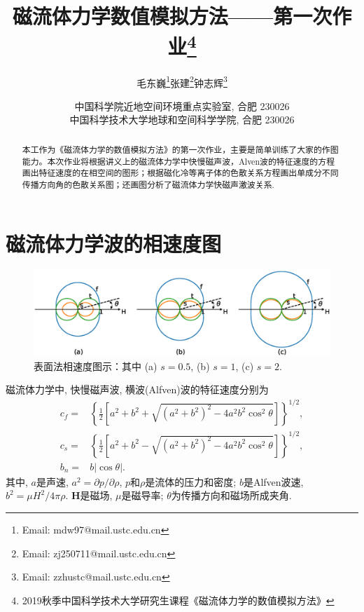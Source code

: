 \documentclass[landscape]{article}
\begin{document}
	
	\renewcommand{\refname}{参考文献}
	\renewcommand{\figurename}{图}
	\renewcommand{\abstractname}{摘要}
	\def\due{2019年9月25日周三0:00}
	
	\title{磁流体力学数值模拟方法——第一次作业\footnote{2019秋季中国科学技术大学研究生课程《磁流体力学的数值模拟方法》}}
	
	
	\author{毛东巍\footnote{Email: mdw97@mail.ustc.edu.cn}\quad 张建\footnote{Email: zj250711@mail.ustc.edu.cn}\quad 钟志辉\footnote{Email: zzhustc@mail.ustc.edu.cn}}
	
	\date{%
		\scriptsize%
		中国科学院近地空间环境重点实验室, 合肥 230026\\
		中国科学技术大学地球和空间科学学院, 合肥 230026
	}
	
	\maketitle
	
	\begin{abstract}
		本工作为《磁流体力学的数值模拟方法》的第一次作业，主要是简单训练了大家的作图能力。本次作业将根据讲义上的磁流体力学中快慢磁声波，Alven波的特征速度的方程画出特征速度的在相空间的图形；根据磁化冷等离子体的色散关系方程画出单成分不同传播方向角的色散关系图；还画图分析了磁流体力学快磁声激波关系.
	\end{abstract}
	
	\section{磁流体力学波的相速度图}

    \begin{figure}[htb]
		\centering
		\includegraphics[width=\textwidth]{figure1.eps}
		\caption{表面法相速度图示：其中 (a) $s = 0.5$, (b) $s=1$, (c) $s=2$.}\label{Friedrich}
	\end{figure}
	
	磁流体力学中, 快慢磁声波, 横波(Alfven)波的特征速度分别为\citep{Jeffrey1964}
	\begin{align}
		c_f =& \left\{\frac{1}{2} \left[a^2 + b^2 + \sqrt{(a^2 + b^2)^2 - 4 a^2 b^2
			\cos^2\theta}\right]\right\}^{1/2},
		\\
		c_s =& \left\{\frac{1}{2} \left[a^2 + b^2 - \sqrt{(a^2 + b^2)^2 - 4 a^2 b^2
			\cos^2\theta}\right]\right\}^{1/2},
		\\
		b_n =& b \left|\cos\theta\right|.
	\end{align}
	其中, $a$是声速, $a^2 = \partial p / \partial \rho$, $p$和$\rho$是流体的压力和密度;
	$b$是Alfven波速, $b^2 = \mu H^2 / 4 \pi \rho$. $\boldsymbol{H}$是磁场, $\mu$是磁导率;
	$\theta$为传播方向和磁场所成夹角.
	
\end{document}
